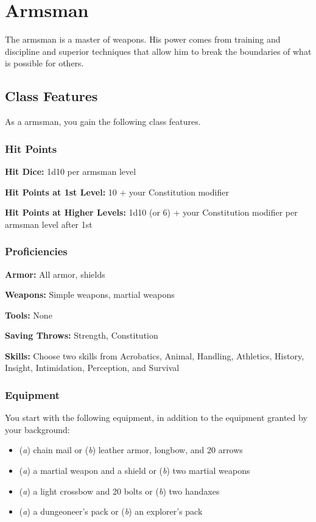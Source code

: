 \section{Armsman}

The armsman is a master of weapons. His power comes from training and discipline and superior techniques that allow him to break the boundaries of what is possible for others.

\subsection{Class Features}

As a armsman, you gain the following class features.

\subsubsection{Hit Points}

\textbf{Hit Dice:} 1d10 per armsman level

\textbf{Hit Points at 1st Level:} 10 + your Constitution modifier

\textbf{Hit Points at Higher Levels:} 1d10 (or 6) + your Constitution modifier per armsman level after 1st

\subsubsection{Proficiencies}

\textbf{Armor:} All armor, shields

\textbf{Weapons:} Simple weapons, martial weapons

\textbf{Tools:} None

\textbf{Saving Throws:} Strength, Constitution

\textbf{Skills:} Choose two skills from Acrobatics, Animal, Handling, Athletics, History, Insight, Intimidation, Perception, and Survival

\subsubsection{Equipment}

You start with the following equipment, in addition to the equipment granted by your background:

\begin{itemize}
\item (\textit{a}) chain mail or (\textit{b}) leather armor, longbow, and 20 arrows
\item (\textit{a}) a martial weapon and a shield or (\textit{b}) two martial weapons
\item (\textit{a}) a light crossbow and 20 bolts or (\textit{b}) two handaxes
\item (\textit{a}) a dungeoneer’s pack or (\textit{b}) an explorer’s pack
\end{itemize}

